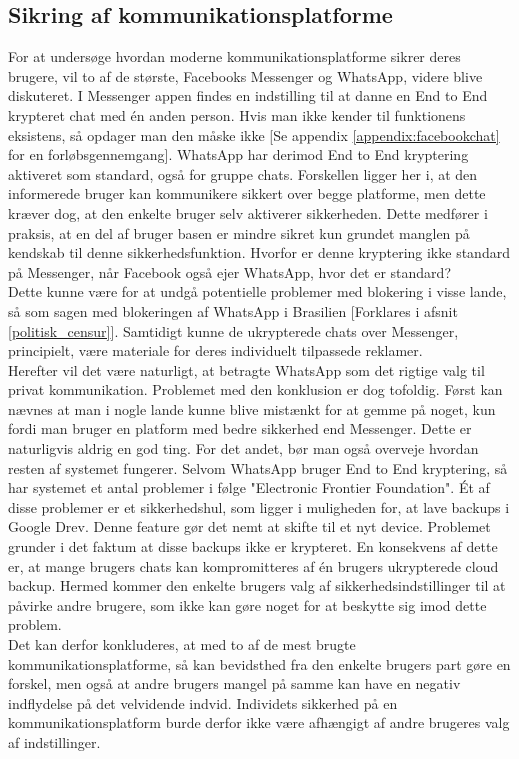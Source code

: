 \subsection{Sikring af kommunikationsplatforme}
\label{kommunikationsplatforme}
For at undersøge hvordan moderne kommunikationsplatforme sikrer deres brugere, vil to af de største, Facebooks Messenger og WhatsApp, videre blive diskuteret. I Messenger appen findes en indstilling til at danne en End to End krypteret chat med én anden person. Hvis man ikke kender til funktionens eksistens, så opdager man den måske ikke [Se appendix \ref{appendix:facebookchat} for en forløbsgennemgang]. WhatsApp har derimod End to End kryptering aktiveret som standard, også for gruppe chats. Forskellen ligger her i, at den informerede bruger kan kommunikere sikkert over begge platforme, men dette kræver dog, at den enkelte bruger selv aktiverer sikkerheden. Dette medfører i praksis, at en del af bruger basen er mindre sikret kun grundet manglen på kendskab til denne sikkerhedsfunktion. Hvorfor er denne kryptering ikke standard på Messenger, når Facebook også ejer WhatsApp\cite{Facebook_WhatsApp_Merger}, hvor det er standard?\\ 
Dette kunne være for at undgå potentielle problemer med blokering i visse lande\cite{Facebook_security_features}, så som sagen med blokeringen af WhatsApp i Brasilien [Forklares i afsnit \ref{politisk_censur}]. Samtidigt kunne de ukrypterede chats over Messenger, principielt, være materiale for deres individuelt tilpassede reklamer.
\\
Herefter vil det være naturligt, at betragte WhatsApp som det rigtige valg til privat kommunikation. Problemet med den konklusion er dog tofoldig. Først kan nævnes at man i nogle lande kunne blive mistænkt for at gemme på noget, kun fordi man bruger en platform med bedre sikkerhed end Messenger. Dette er naturligvis aldrig en god ting. For det andet, bør man også overveje hvordan resten af systemet fungerer. Selvom WhatsApp bruger End to End kryptering, så har systemet et antal problemer i følge "Electronic Frontier Foundation"\cite{WhatsApp_Security_Concerns}. Ét af disse problemer er et sikkerhedshul, som ligger i muligheden for, at lave backups i Google Drev. Denne feature gør det nemt at skifte til et nyt device. Problemet grunder i det faktum at disse backups ikke er krypteret. En konsekvens af dette er, at mange brugers chats kan kompromitteres af én brugers ukrypterede cloud backup. Hermed kommer den enkelte brugers valg af sikkerhedsindstillinger til at påvirke andre brugere, som ikke kan gøre noget for at beskytte sig imod dette problem.
\\
Det kan derfor konkluderes, at med to af de mest brugte kommunikationsplatforme, så kan bevidsthed fra den enkelte brugers part gøre en forskel, men også at andre brugers mangel på samme kan have en negativ indflydelse på det velvidende indvid. Individets sikkerhed på en kommunikationsplatform burde derfor ikke være afhængigt af andre brugeres valg af indstillinger.